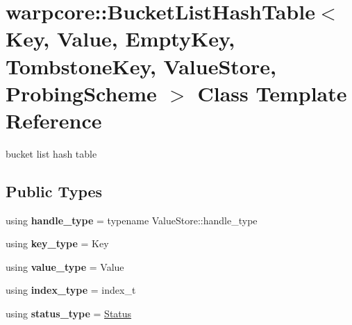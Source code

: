 \hypertarget{classwarpcore_1_1BucketListHashTable}{}\section{warpcore\+:\+:Bucket\+List\+Hash\+Table$<$ Key, Value, Empty\+Key, Tombstone\+Key, Value\+Store, Probing\+Scheme $>$ Class Template Reference}
\label{classwarpcore_1_1BucketListHashTable}


bucket list hash table  


\subsection*{Public Types}
\begin{DoxyCompactItemize}
\item 
\mbox{\label{classwarpcore_1_1BucketListHashTable_a3b5a31bb17842cc625c9fd05eaa09b7e}} 
using {\bfseries handle\+\_\+type} = typename Value\+Store\+::handle\+\_\+type
\item 
\mbox{\label{classwarpcore_1_1BucketListHashTable_a45e62dcb7366c80045242641a6202f94}} 
using {\bfseries key\+\_\+type} = Key
\item 
\mbox{\label{classwarpcore_1_1BucketListHashTable_a1b420d31a115b7d6bb58e2daffb7a57d}} 
using {\bfseries value\+\_\+type} = Value
\item 
\mbox{\label{classwarpcore_1_1BucketListHashTable_ad778fef44ccd3c1818ac2ced0d8a6c20}} 
using {\bfseries index\+\_\+type} = index\+\_\+t
\item 
\mbox{\label{classwarpcore_1_1BucketListHashTable_a1128331e42565aa68b8fe424b4b83187}} 
using {\bfseries status\+\_\+type} = \hyperlink{classwarpcore_1_1Status}{Status}
\end{DoxyCompactItemize}
